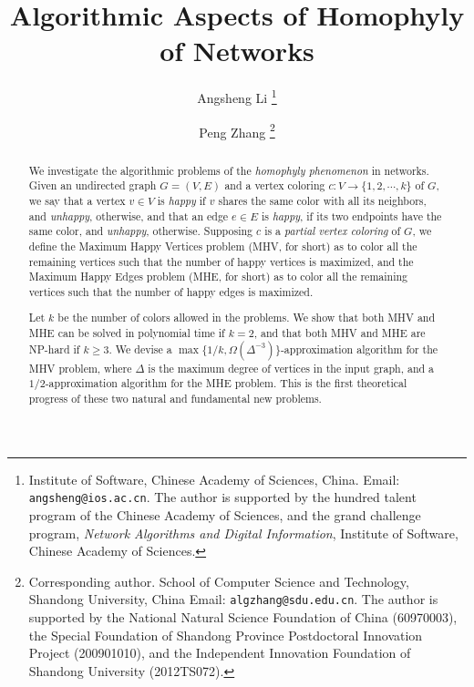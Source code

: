 \documentclass[11pt]{article}
\begin{document}
\title{Algorithmic Aspects of Homophyly of Networks}

\author{
Angsheng Li
\thanks{Institute of Software, Chinese Academy of Sciences, China.
  Email: \texttt{angsheng@ios.ac.cn}.
  The author is supported by the hundred talent program of the Chinese Academy of Sciences,
  and the grand challenge program, {\it Network Algorithms and Digital Information},
  Institute of Software, Chinese Academy of Sciences.}
\and
Peng Zhang
\thanks{Corresponding author.
  School of Computer Science and Technology, Shandong University, China
  Email: \texttt{algzhang@sdu.edu.cn}.
  The author is supported by the National Natural Science Foundation of China (60970003),
  the Special Foundation of Shandong Province Postdoctoral Innovation Project (200901010),
  and the Independent Innovation Foundation of Shandong University (2012TS072).}
}


\maketitle


\begin{abstract}
We investigate the algorithmic problems of the {\it homophyly
phenomenon} in networks. Given an undirected graph $G = (V, E)$ and a vertex
coloring $c \colon V \rightarrow \{1, 2, \cdots, k\}$ of $G$, we say that
a vertex $v\in V$ is {\it happy} if $v$ shares the same color with all its
neighbors, and {\it unhappy}, otherwise, and that an edge $e\in E$ is
{\it happy}, if its two endpoints have the same color, and {\it unhappy},
otherwise. Supposing $c$ is a {\it partial vertex coloring} of $G$,
we define the Maximum Happy Vertices problem (MHV, for
short) as to color all the remaining vertices such that the number
of happy vertices is maximized, and the Maximum Happy Edges problem
(MHE, for short) as to color all the remaining vertices such that
the number of happy edges is maximized.

Let $k$ be the number of colors allowed in the problems.
We show that both MHV and MHE can be solved in polynomial time
if $k = 2$, and that both MHV and MHE are NP-hard if $k \geq 3$.
We devise a $\max \{1/k, \Omega(\Delta^{-3})\}$-approximation algorithm
for the MHV problem, where $\Delta$ is the maximum degree of vertices in
the input graph, and a $1/2$-approximation algorithm for the MHE problem.
This is the first theoretical progress of these two natural and fundamental
new problems.
\end{abstract}
\end{document}
